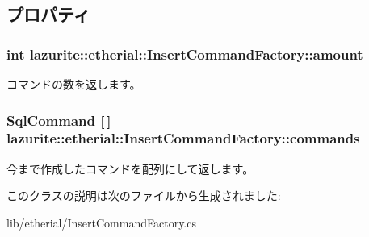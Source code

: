 \subsection{プロパティ}
\hypertarget{classlazurite_1_1etherial_1_1_insert_command_factory_a1a4306715cc6a503e8e5e8e20b4fb318}{
\subsubsection[{amount}]{\setlength{\rightskip}{0pt plus 5cm}int lazurite::etherial::InsertCommandFactory::amount}}
\label{classlazurite_1_1etherial_1_1_insert_command_factory_a1a4306715cc6a503e8e5e8e20b4fb318}
コマンドの数を返します。 \hypertarget{classlazurite_1_1etherial_1_1_insert_command_factory_aa678220213402cdb7f9830042b271a2f}{
\subsubsection[{commands}]{\setlength{\rightskip}{0pt plus 5cm}SqlCommand \mbox{[}$\,$\mbox{]} lazurite::etherial::InsertCommandFactory::commands}}
\label{classlazurite_1_1etherial_1_1_insert_command_factory_aa678220213402cdb7f9830042b271a2f}
今まで作成したコマンドを配列にして返します。 

このクラスの説明は次のファイルから生成されました:\begin{DoxyCompactItemize}
\item 
lib/etherial/InsertCommandFactory.cs\end{DoxyCompactItemize}
